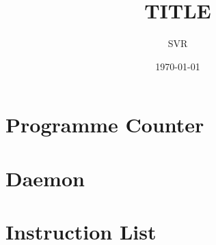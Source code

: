 \documentclass[12pt]{extarticle}
\title{TITLE}
\author{SVR}
\date{\today}
\begin{document}
\maketitle


\lipsum
\lipsum



\newpage
\begin{paracol}{2}
    \section*{Programme Counter}
    \lipsum[0-1]
    \switchcolumn
    \section*{Daemon}
    \lipsum[0-1]
    \section*{Instruction List}
    \lipsum[0-1]
\end{paracol}




\end{document}
